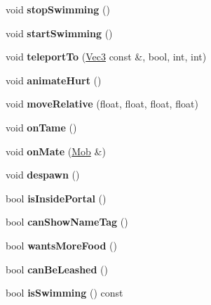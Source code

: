 \begin{DoxyCompactItemize}
void {\bfseries stop\+Swimming} ()
\item 
\mbox{\label{struct_actor_ad839a26056045310dad02173278502d5}} 
void {\bfseries start\+Swimming} ()
\item 
\mbox{\label{struct_actor_acbf0b87333aaf146b8e81807a9f90f20}} 
void {\bfseries teleport\+To} (\mbox{\hyperlink{struct_vec3}{Vec3}} const \&, bool, int, int)
\item 
\mbox{\label{struct_actor_a13a58ffacbb6f51464a6cf54f5cd97d2}} 
void {\bfseries animate\+Hurt} ()
\item 
\mbox{\label{struct_actor_a05affb554d737e9754390fee9669d23a}} 
void {\bfseries move\+Relative} (float, float, float, float)
\item 
\mbox{\label{struct_actor_a82d8b26cb190d2e005c8afda9bd2ccc7}} 
void {\bfseries on\+Tame} ()
\item 
\mbox{\label{struct_actor_a7a79b605ce650dd8d4fe4d0577a082c2}} 
void {\bfseries on\+Mate} (\mbox{\hyperlink{struct_mob}{Mob}} \&)
\item 
\mbox{\label{struct_actor_a15866bbfd44d806689ce59c88d6c97d1}} 
void {\bfseries despawn} ()
\item 
\mbox{\label{struct_actor_a45801a7a8d91dd0d1d4bce00f682f775}} 
bool {\bfseries is\+Inside\+Portal} ()
\item 
\mbox{\label{struct_actor_a9ca01f1b6f53550e88d90b8b0b11b2f2}} 
bool {\bfseries can\+Show\+Name\+Tag} ()
\item 
\mbox{\label{struct_actor_a56a3b6eabd489b2f99e9420a4b7f293f}} 
bool {\bfseries wants\+More\+Food} ()
\item 
\mbox{\label{struct_actor_a6215ebbb8150cc963f3ae1daa4348bff}} 
bool {\bfseries can\+Be\+Leashed} ()
\item 
\mbox{\label{struct_actor_ae69a25bbff5bf87cb6e9f71ebfa9e6e0}} 
bool {\bfseries is\+Swimming} () const

\end{DoxyCompactItemize}
